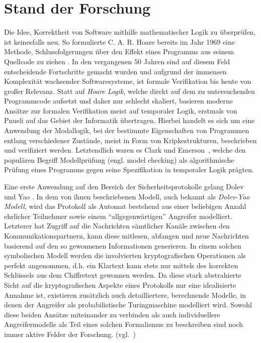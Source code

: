 \section{Stand der Forschung}
\label{related}

Die Idee, Korrektheit von Software mithilfe mathematischer Logik zu überprüfen, ist keinesfalls neu.
So formulierte C. A. R. Hoare bereits im Jahr 1969 eine Methode, Schlussfolgerungen über den Effekt eines Programms aus seinem Quellcode zu ziehen \cite{hoare1969axiomatic}.
In den vergangenen 50 Jahren sind auf diesem Feld entscheidende Fortschritte gemacht wurden und aufgrund der immensen Komplexität wachsender Softwaresysteme, ist formale Verifikation bis heute von großer Relevanz.
Statt auf \textit{Hoare Logik}, welche direkt auf dem zu untersuchenden Programmcode aufsetzt und daher nur schlecht skaliert, basieren moderne Ansätze zur formalen Verifikation meist auf temporaler Logik, erstmals von Pnueli \cite{pnueli1977temporal} auf das Gebiet der Informatik übertragen.
Hierbei handelt es sich um eine Anwendung der Modallogik, bei der bestimmte Eigenschaften von Programmen entlang verschiedener Zustände, meist in Form von Kripkestrukturen, beschrieben und verifiziert werden. 
Letztendlich waren es Clark und Emerson~\cite{clarke1981design}, welche den populären Begriff Modellprüfung (engl. model checking) als algorithmische Prüfung eines Programms gegen seine Spezifikation in temporaler Logik prägten.

Eine erste Anwendung auf den Bereich der Sicherheitsprotokolle gelang Dolev und Yao \cite{dolev1983security}.
In dem von ihnen beschriebenen Modell, auch bekannt als \textit{Dolev-Yao Modell}, wird das Protokoll als Automat bestehend aus einer beliebigen Anzahl ehrlicher Teilnehmer sowie einem ``allgegenwärtigen'' Angreifer modelliert.
Letzterer hat Zugriff auf die Nachrichten sämtlicher Kanäle zwischen den Kommunikationspartnern, kann diese mitlesen, abfangen und neue Nachrichten basierend auf den so gewonnenen Informationen generieren.
In einem solchen symbolischen Modell werden die involvierten kryptografischen Operationen als perfekt angenommen, d.h. ein Klartext kann stets nur mittels des korrekten Schlüssels aus dem Chiffretext gewonnen werden. 
Da diese stark abstrahierte Sicht auf die kryptografischen Aspekte eines Protokolls nur eine idealisierte Annahme ist, existieren zusätzlich auch detailliertere, berechnende Modelle, in denen der Angreifer als probabilistische Turingmaschine modelliert wird.
Sowohl diese beiden Ansätze miteinander zu verbinden als auch individuellere Angreifermodelle als Teil eines solchen Formalismus zu beschreiben sind noch immer aktive Felder der Forschung. (vgl.~\cite{basin2018model})


